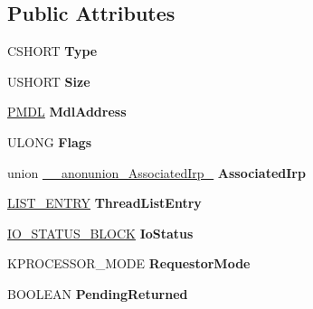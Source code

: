 \subsection*{Public Attributes}
\begin{DoxyCompactItemize}
\item 
\hypertarget{struct__IRP_a3bb466ed61d86b471251774d7fbbba65}{}C\+S\+H\+O\+R\+T {\bfseries Type}\label{struct__IRP_a3bb466ed61d86b471251774d7fbbba65}

\item 
\hypertarget{struct__IRP_a94190a1c7d0061eb44eb19197580f6e8}{}U\+S\+H\+O\+R\+T {\bfseries Size}\label{struct__IRP_a94190a1c7d0061eb44eb19197580f6e8}

\item 
\hypertarget{struct__IRP_ae307311a6b40f96a7bb5b52d018aca27}{}\hyperlink{struct__MDL}{P\+M\+D\+L} {\bfseries Mdl\+Address}\label{struct__IRP_ae307311a6b40f96a7bb5b52d018aca27}

\item 
\hypertarget{struct__IRP_aca5eb11714d026adcece54b25b6785b2}{}U\+L\+O\+N\+G {\bfseries Flags}\label{struct__IRP_aca5eb11714d026adcece54b25b6785b2}

\item 
\hypertarget{struct__IRP_a00ad459ac81f31e3a01ae2122bcd1f09}{}union \hyperlink{union____anonunion__AssociatedIrp__44}{\+\_\+\+\_\+anonunion\+\_\+\+Associated\+Irp\+\_} {\bfseries Associated\+Irp}\label{struct__IRP_a00ad459ac81f31e3a01ae2122bcd1f09}

\item 
\hypertarget{struct__IRP_ad2a3a38bf3a8431ec5d131fc9aa9caba}{}\hyperlink{struct__LIST__ENTRY}{L\+I\+S\+T\+\_\+\+E\+N\+T\+R\+Y} {\bfseries Thread\+List\+Entry}\label{struct__IRP_ad2a3a38bf3a8431ec5d131fc9aa9caba}

\item 
\hypertarget{struct__IRP_a85cb0a688442b1e8d13958580b59623a}{}\hyperlink{struct__IO__STATUS__BLOCK}{I\+O\+\_\+\+S\+T\+A\+T\+U\+S\+\_\+\+B\+L\+O\+C\+K} {\bfseries Io\+Status}\label{struct__IRP_a85cb0a688442b1e8d13958580b59623a}

\item 
\hypertarget{struct__IRP_a90fb0d6a6f6e8c2eea5b4782d8fc58d4}{}K\+P\+R\+O\+C\+E\+S\+S\+O\+R\+\_\+\+M\+O\+D\+E {\bfseries Requestor\+Mode}\label{struct__IRP_a90fb0d6a6f6e8c2eea5b4782d8fc58d4}

\item 
\hypertarget{struct__IRP_abc7dc85e233ad65ab5650d1076c3010d}{}B\+O\+O\+L\+E\+A\+N {\bfseries Pending\+Returned}\label{struct__IRP_abc7dc85e233ad65ab5650d1076c3010d}


\end{DoxyCompactItemize}
